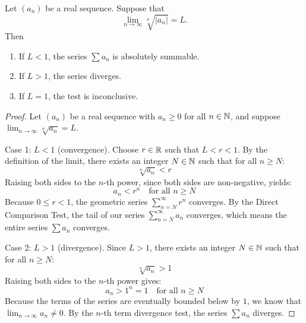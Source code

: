 \documentclass[../analysis1.tex]{subfiles}
\begin{document}
\begin{theorem}
\label{thm:roottest}
    \begin{shaded*}
        Let $(a_n)$ be a real sequence. Suppose that $$\lim_{n \to \infty} \sqrt[n]{|a_n|} = L.$$
        Then
        \begin{enumerate}
            \item[1.] If $L < 1$, the series $\sum a_n$ is absolutely summable.
            \item[2.] If $L > 1$, the series diverges.
            \item[3.] If $L = 1$, the test is inconclusive.
        \end{enumerate}
    \end{shaded*}
\end{theorem}
\begin{proof}
    Let $(a_n)$ be a real sequence with $a_n \ge 0$ for all $n \in \mathbb{N}$, and suppose $\lim_{n \to \infty} \sqrt[n]{a_n} = L$.\par
    Case 1: $L < 1$ (convergence). Choose $r\in\mathbb{R}$ such that $L < r < 1$. By the definition of the limit, there exists an integer $N \in \mathbb{N}$ such that for all $n \ge N$:
    \[ \sqrt[n]{a_n} < r \]
    Raising both sides to the $n$-th power, since both sides are non-negative, yields:
    \[ a_n < r^n \quad \text{for all } n \ge N \]
    Because $0 \le r < 1$, the geometric series $\sum_{n=N}^{\infty} r^n$ converges. By the Direct Comparison Test, the tail of our series $\sum_{n=N}^{\infty} a_n$ converges, which means the entire series $\sum a_n$ converges.\par

    Case 2: $L > 1$ (divergence).
    Since $L > 1$, there exists an integer $N \in \mathbb{N}$ such that for all $n \ge N$:
    \[ \sqrt[n]{a_n} > 1 \]
    Raising both sides to the $n$-th power gives:
    \[ a_n > 1^n = 1 \quad \text{for all } n \ge N \]
    Because the terms of the series are eventually bounded below by $1$, we know that $\lim_{n \to \infty} a_n \neq 0$. By the $n$-th term divergence test, the series $\sum a_n$ diverges.\qedhere
\end{proof}
\end{document}
